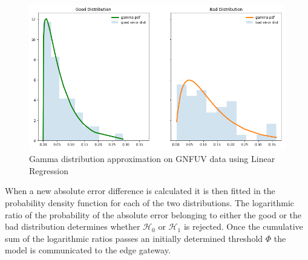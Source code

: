 \documentclass{mpaper}
\begin{document}
\begin{figure}[h]
    \centering
    \includegraphics[scale=0.3]{imgs/goodVSbad.png}
    \caption{Gamma distribution approximation on GNFUV data using Linear Regression}
    \label{fig:goodvsbad}
\end{figure}

When a new absolute error difference is calculated it is then fitted in the probability density function for each of the two distributions. The logarithmic ratio of the probability of the absolute error belonging to either the good or the bad distribution determines whether $\mathcal{H}_0$ or $\mathcal{H}_1$ is rejected. Once the cumulative sum of the logarithmic ratios passes an initially determined threshold $\Phi$ the model is communicated to the edge gateway.

\end{document}
